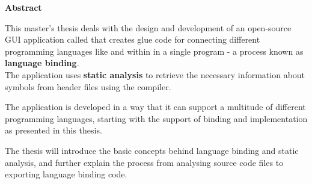 \thispagestyle{empty}
\textbf{Abstract}

This master's thesis deals with the design and development of an open-source GUI application called  that creates glue code for connecting different programming languages like  and  within in a single program - a process known as \textbf{language binding}.\\
The application uses \textbf{static analysis} to retrieve the necessary information about symbols from  header files using the   compiler.

The application is developed in a way that it can support a multitude of different programming languages, starting with the support of binding  and  implementation  as presented in this thesis.

The thesis will introduce the basic concepts behind language binding and static analysis, and further explain the process from analysing source code files to exporting language binding code.